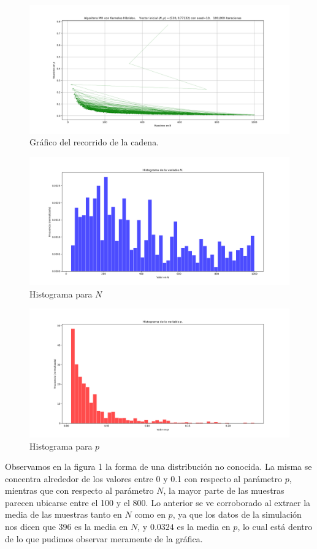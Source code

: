 \documentclass[letterpaper]{article}
\newcommand{\1}{\mathds{1}}
\theoremstyle{definition}
\theoremstyle{definition}
\theoremstyle{definition}
\theoremstyle{definition}
\theoremstyle{definition}
\begin{document}
\begin{itemize}
    \begin{figure}[h!]
        \centering
        \includegraphics[width=\linewidth]{1.png}
        \caption{Gráfico del recorrido de la cadena.}
    \end{figure} 
    \begin{figure}[h!]
        \centering
        \includegraphics[width=\linewidth]{2.png}
        \caption{Histograma para $N$}
    \end{figure} 
    \begin{figure}[h!]
        \centering
        \includegraphics[width=\linewidth]{3.png}
        \caption{Histograma para $p$}
    \end{figure} 
    Observamos en la figura 1 la forma de una distribución no conocida. La misma se concentra alrededor de los valores entre 0 y 0.1 
    con respecto al parámetro $p$, mientras que con respecto al parámetro $N$, la mayor parte 
    de las muestras parecen ubicarse entre el 100 y el 800. Lo anterior se ve corroborado al extraer la 
    media de las muestras tanto en $N$ como en $p$, ya que los datos de la simulación nos 
    dicen que 396 es la media en $N$, y $0.0324$ es la media en $p$, lo cual está dentro 
    de lo que pudimos observar meramente de la gráfica.
    \newline


\end{itemize}
\end{document}
